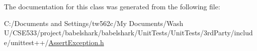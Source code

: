 The documentation for this class was generated from the following file:\begin{CompactItemize}
\item 
C:/Documents and Settings/tw562c/My Documents/Wash U/CSE533/project/babelshark/babelshark/UnitTests/UnitTests/3rdParty/include/unittest++/\hyperlink{_assert_exception_8h}{AssertException.h}\end{CompactItemize}

